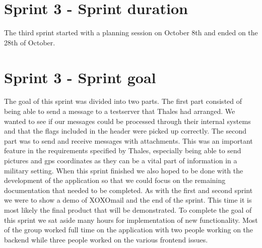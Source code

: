 \section{Sprint 3 - Sprint duration}
The third sprint started with a planning session on October 8th and ended on the 28th of October. 

\section{Sprint 3 - Sprint goal}
The goal of this sprint was divided into two parts. The first part consisted of being able to send a message to a testserver that Thales had arranged. We wanted to see if our messages could be processed through their internal systems and that the flags included in the header were picked up correctly. The second part was to send and receive messages with attachments. This was an important feature in the requirements specified by Thales, especially being able to send pictures and gps coordinates as they can be a vital part of information in a military setting.
\newline
\newline
When this sprint finished we also hoped to be done with the development of the application so that we could focus on the remaining documentation that needed to be completed. As with the first and second sprint we were to show a demo of XOXOmail and the end of the sprint. This time it is most likely the final product that will be demonstrated.
\newline
\newline
To complete the goal of this sprint we sat aside many hours for implementation of new functionality. Most of the group worked full time on the application with two people working on the backend while three people worked on the various frontend issues.